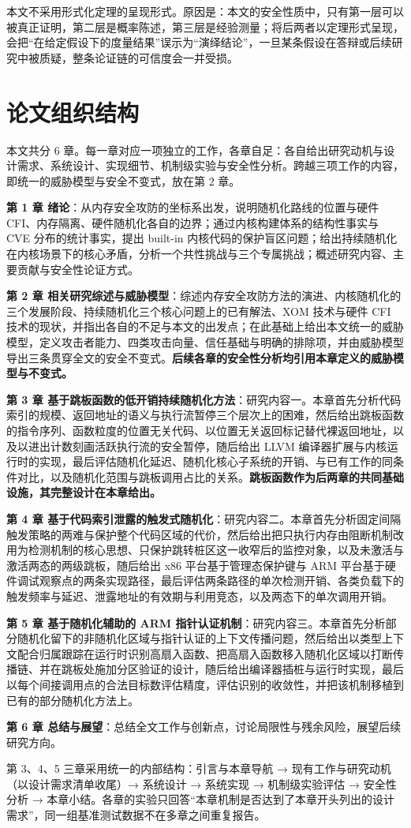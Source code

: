 本文不采用形式化定理的呈现形式。原因是：本文的安全性质中，只有第一层可以被真正证明，第二层是概率陈述，第三层是经验测量；将后两者以定理形式呈现，会把“在给定假设下的度量结果”误示为“演绎结论”，一旦某条假设在答辩或后续研究中被质疑，整条论证链的可信度会一并受损。

\section{论文组织结构}

本文共分 6 章。每一章对应一项独立的工作，各章自足：各自给出研究动机与设计需求、系统设计、实现细节、机制级实验与安全性分析。跨越三项工作的内容，即统一的威胁模型与安全不变式，放在第 2 章。

\textbf{第 1 章 绪论}：从内存安全攻防的坐标系出发，说明随机化路线的位置与硬件 CFI、内存隔离、硬件随机化各自的边界；通过内核构建体系的结构性事实与 CVE 分布的统计事实，提出 built-in 内核代码的保护盲区问题；给出持续随机化在内核场景下的核心矛盾，分析一个共性挑战与三个专属挑战；概述研究内容、主要贡献与安全性论证方式。

\textbf{第 2 章 相关研究综述与威胁模型}：综述内存安全攻防方法的演进、内核随机化的三个发展阶段、持续随机化三个核心问题上的已有解法、XOM 技术与硬件 CFI 技术的现状，并指出各自的不足与本文的出发点；在此基础上给出本文统一的威胁模型，定义攻击者能力、四类攻击向量、信任基础与明确的排除项，并由威胁模型导出三条贯穿全文的安全不变式。\textbf{后续各章的安全性分析均引用本章定义的威胁模型与不变式。}

\textbf{第 3 章 基于跳板函数的低开销持续随机化方法}：研究内容一。本章首先分析代码索引的规模、返回地址的语义与执行流暂停三个层次上的困难，然后给出跳板函数的指令序列、函数粒度的位置无关代码、以位置无关返回标记替代裸返回地址，以及以进出计数刻画活跃执行流的安全暂停，随后给出 LLVM 编译器扩展与内核运行时的实现，最后评估随机化延迟、随机化核心子系统的开销、与已有工作的同条件对比，以及随机化范围与跳板调用占比的关系。\textbf{跳板函数作为后两章的共同基础设施，其完整设计在本章给出。}

\textbf{第 4 章 基于代码索引泄露的触发式随机化}：研究内容二。本章首先分析固定间隔触发策略的两难与保护整个代码区域的代价，然后给出把只执行内存由阻断机制改用为检测机制的核心思想、只保护跳转桩区这一收窄后的监控对象，以及未激活与激活两态的两级跳板，随后给出 x86 平台基于管理态保护键与 ARM 平台基于硬件调试观察点的两条实现路径，最后评估两条路径的单次检测开销、各类负载下的触发频率与延迟、泄露地址的有效期与利用竞态，以及两态下的单次调用开销。

\textbf{第 5 章 基于随机化辅助的 ARM 指针认证机制}：研究内容三。本章首先分析部分随机化留下的非随机化区域与指针认证的上下文传播问题，然后给出以类型上下文配合归属跟踪在运行时识别高扇入函数、把高扇入函数移入随机化区域以打断传播链、并在跳板处施加分区验证的设计，随后给出编译器插桩与运行时实现，最后以每个间接调用点的合法目标数评估精度，评估识别的收敛性，并把该机制移植到已有的部分随机化方法上。

\textbf{第 6 章 总结与展望}：总结全文工作与创新点，讨论局限性与残余风险，展望后续研究方向。

第 3、4、5 三章采用统一的内部结构：引言与本章导航 → 现有工作与研究动机（以设计需求清单收尾）→ 系统设计 → 系统实现 → 机制级实验评估 → 安全性分析 → 本章小结。各章的实验只回答“本章机制是否达到了本章开头列出的设计需求”，同一组基准测试数据不在多章之间重复报告。


